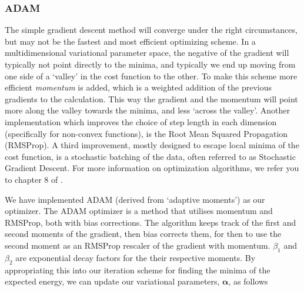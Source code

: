 






\subsubsection{ADAM}\label{sec:adam}

The simple gradient descent method will converge under the right circumstances, but may not be the fastest and most efficient optimizing scheme. In a multidimensional variational parameter space, the negative of the gradient will typically not point directly to the minima, and typically we end up moving from one side of a `valley' in the cost function to the other. To make this scheme more efficient \textit{momentum} is added, which is a weighted addition of the previous gradients to the calculation. This way the gradient and the momentum will point more along the valley towards the minima, and less `across the valley'. Another implementation which improves the choice of step length in each dimension (specifically for non-convex functions), is the Root Mean Squared Propagation (RMSProp). A third improvement, mostly designed to escape local minima of the cost function, is a stochastic batching of the data, often referred to as Stochastic Gradient Descent. For more information on optimization algorithms, we refer you to chapter 8 of \citep{Goodfellow-et-al-2016}. 

We have implemented ADAM (derived from `adaptive moments') as our optimizer. The ADAM optimizer \citep{kingma2017adam} is a method that utilises momentum and RMSProp, both with bias corrections. The algorithm keeps track of the first and second moments of the gradient, then bias corrects them, for then to use the second moment as an RMSProp rescaler of the gradient with momentum. $\beta_1$ and $\beta_2$ are exponential decay factors for the their respective moments. 
By appropriating this into our iteration scheme for finding the minima of the expected energy, we can update our variational parameters, $\bm{\alpha}$, as follows


